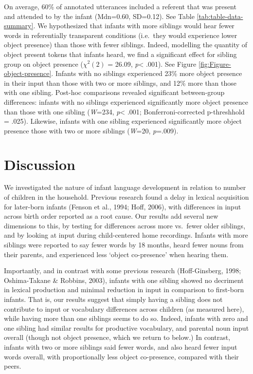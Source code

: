 \documentclass[
  english,
  man,floatsintext]{apa6}
\begin{document}
On average, 60\% of annotated utterances included a referent that was present and attended to by the infant (Mdn=0.60, SD=0.12). See Table \ref{tab:table-data-summary}. We hypothesized that infants with more siblings would hear fewer words in referentially transparent conditions (i.e.~they would experience lower object presence) than those with fewer siblings. Indeed, modelling the quantity of object present tokens that infants heard, we find a significant effect for sibling group on object presence (\(\chi^2 (2)\) = 26.09, \emph{p}\textless{} .001). See Figure \ref{fig:Figure-object-presence}. Infants with no siblings experienced 23\% more object presence in their input than those with two or more siblings, and 12\% more than those with one sibling. Post-hoc comparisons revealed significant between-group differences: infants with no siblings experienced significantly more object presence than those with one sibling (\emph{W}=234, \emph{p}\textless{} .001; Bonferroni-corrected p-threshhold = .025). Likewise, infants with one sibling experienced significantly more object presence those with two or more siblings (\emph{W}=20, \emph{p}=.009).

\hypertarget{discussion}{%
\section{Discussion}\label{discussion}}

We investigated the nature of infant language development in relation to number of children in the household. Previous research found a delay in lexical acquisition for later-born infants (Fenson et al., 1994; Hoff, 2006), with differences in input across birth order reported as a root cause. Our results add several new dimensions to this, by testing for differences across more vs.~fewer older siblings, and by looking at input during child-centered home recordings. Infants with more siblings were reported to say fewer words by 18 months, heard fewer nouns from their parents, and experienced less `object co-presence' when hearing them.

Importantly, and in contrast with some previous research (Hoff-Ginsberg, 1998; Oshima-Takane \& Robbins, 2003), infants with one sibling showed no decriment in lexical production and minimal reduction in input in comparison to first-born infants. That is, our results suggest that simply having a sibling does not contribute to input or vocabulary differences across children (as measured here), while having more than one siblings seems to do so. Indeed, infants with zero and one sibling had similar results for productive vocabulary, and parental noun input overall (though not object presence, which we return to below.) In contrast, infants with two or more siblings said fewer words, and also heard fewer input words overall, with proportionally less object co-presence, compared with their peers.
\end{document}
